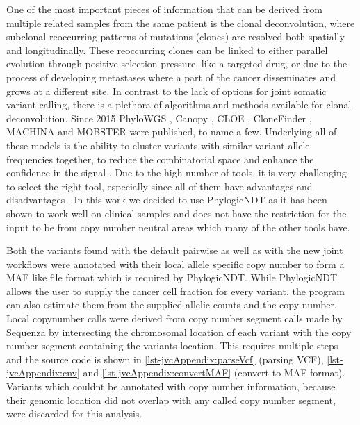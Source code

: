 One of the most important pieces of information that can be derived from multiple related samples from the same patient is the clonal deconvolution, where subclonal reoccurring patterns of mutations (clones) are resolved both spatially and longitudinally. These reoccurring clones can be linked to either parallel evolution through positive selection pressure, like a targeted drug, or due to the process of developing metastases where a part of the cancer disseminates and grows at a different site.
In contrast to the lack of options for joint somatic variant calling, there is a plethora of algorithms and methods available for clonal deconvolution. Since 2015 PhyloWGS \cite{Deshwar2015}, Canopy \cite{Jiang2016}, CLOE \cite{Marass2016}, CloneFinder \cite{Miura2018}, MACHINA \cite{ElKebir2018} and MOBSTER \cite{Caravagna2020} were published, to name a few. Underlying all of these models is the ability to cluster variants with similar variant allele frequencies together, to reduce the combinatorial space and enhance the confidence in the signal \cite{Tarabichi2021}. Due to the high number of tools, it is very challenging to select the right tool, especially since all of them have advantages and disadvantages \cite{Miura2020}. In this work we decided to use PhylogicNDT \cite{Leshchiner2018} as it has been shown to work well on clinical samples \cite{Gerstung2020} and does not have the restriction for the input to be from copy number neutral areas which many of the other tools have.


Both the variants found with the default pairwise as well as with the new joint workflows were annotated with their local allele specific copy number to form a MAF like file format which is required by PhylogicNDT. While PhylogicNDT allows the user to supply the cancer cell fraction for every variant, the program can also estimate them from the supplied allelic counts and the copy number. Local copynumber calls were derived from copy number segment calls made by Sequenza by intersecting the chromosomal location of each variant with the copy number segment containing the variants location. This requires multiple steps and the source code is shown in \autoref{lst-jvcAppendix:parseVcf} (parsing VCF), \autoref{lst-jvcAppendix:cnv} and \autoref{lst-jvcAppendix:convertMAF} (convert to MAF format). Variants which couldnt be annotated with copy number information, because their genomic location did not overlap with any called copy number segment, were discarded for this analysis.

